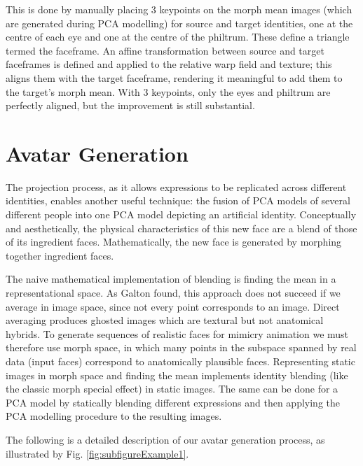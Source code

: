 \documentclass[runningheads]{llncs}
\begin{document}
This is done by manually placing 3 keypoints on the morph mean images (which are generated during PCA modelling) for source and target identities, one at the centre of each eye and one at the centre of the philtrum. These define a triangle termed the faceframe. An affine transformation between source and target faceframes is defined and applied to the relative warp field and texture; this aligns them with the target faceframe, rendering it meaningful to add them to the target's morph mean. With 3 keypoints, only the eyes and philtrum are perfectly aligned, but the improvement is still substantial. 


\section{Avatar Generation}

The projection process, as it allows expressions to be replicated across different identities, enables another useful technique: the fusion of PCA models of several different people into one PCA model depicting an artificial identity. Conceptually and aesthetically, the physical characteristics of this new face are a blend of those of its ingredient faces. Mathematically, the new face is generated by morphing together ingredient faces.


The naive mathematical implementation of blending is finding the mean in a representational space. As Galton found\cite{galton1879composite}, this approach does not succeed if we average in image space, since not every point corresponds to an image. Direct averaging produces ghosted images which are textural but not anatomical hybrids. To generate sequences of realistic faces for mimicry animation we must therefore use morph space, in which many points in the subspace spanned by real data (input faces) correspond to anatomically plausible faces. Representing static images in morph space and finding the mean implements identity blending (like the classic morph special effect\cite{rotshtein2004morphing}) in static images. The same can be done for a PCA model by statically blending different expressions and then applying the PCA modelling procedure to the resulting images.


The following is a detailed description of our avatar generation process, as illustrated by Fig. \ref{fig:subfigureExample1}.
\end{document}
